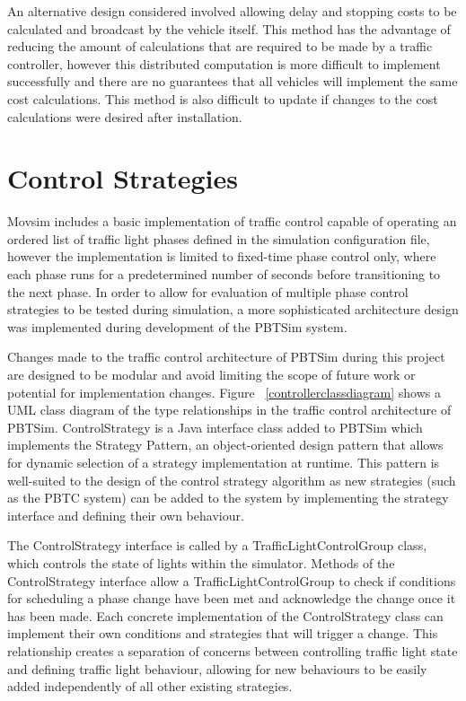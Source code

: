 An alternative design considered involved allowing delay and stopping costs to be calculated and broadcast by the vehicle itself. This method has the advantage of reducing the amount of calculations that are required to be made by a traffic controller, however this distributed computation is more difficult to implement successfully and there are no guarantees that all vehicles will implement the same cost calculations. This method is also difficult to update if changes to the cost calculations were desired after installation.

\section{Control Strategies}

Movsim includes a basic implementation of traffic control capable of operating an ordered list of traffic light phases defined in the simulation configuration file, however the implementation is limited to fixed-time phase control only, where each phase runs for a predetermined number of seconds before transitioning to the next phase. In order to allow for evaluation of multiple phase control strategies to be tested during simulation, a more sophisticated architecture design was implemented during development of the PBTSim system. 

Changes made to the traffic control architecture of PBTSim during this project are designed to be modular and avoid limiting the scope of future work or potential for implementation changes. Figure ~\ref{controllerclassdiagram} shows a UML class diagram of the type relationships in the traffic control architecture of PBTSim. ControlStrategy is a Java interface class added to PBTSim which implements the Strategy Pattern, an object-oriented design pattern that allows for dynamic selection of a strategy implementation at runtime. This pattern is well-suited to the design of the control strategy algorithm as new strategies (such as the PBTC system) can be added to the system by implementing the strategy interface and defining their own behaviour. %

The ControlStrategy interface is called by a TrafficLightControlGroup class, which controls the state of lights within the simulator. Methods of the ControlStrategy interface allow a TrafficLightControlGroup to check if conditions for scheduling a phase change have been met and acknowledge the change once it has been made. Each concrete implementation of the ControlStrategy class can implement their own conditions and strategies that will trigger a change. This relationship creates a separation of concerns between controlling traffic light state and defining traffic light behaviour, allowing for new behaviours to be easily added independently of all other existing strategies. 

